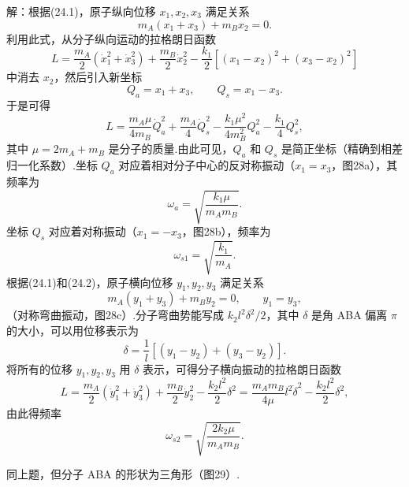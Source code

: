 \begin{xiti}
解：根据(24.1)，原子纵向位移 $x_1,x_2,x_3$ 满足关系
\begin{equation*}
  m_A\left(x_1+x_3\right)+m_Bx_2=0.
\end{equation*}
利用此式，从分子纵向运动的拉格朗日函数
\begin{equation*}
  L=\frac{m_A}{2}\left(\dot{x}_1^2+\dot{x}_3^2\right)+\frac{m_B}{2}\dot{x}_2^2
  -\frac{k_1}{2}\left[\left(x_1-x_2\right)^2+\left(x_3-x_2\right)^2\right]
\end{equation*}
中消去 $x_2$，然后引入新坐标
\begin{equation*}
  Q_a=x_1+x_3,\qquad
  Q_s=x_1-x_3.
\end{equation*}
于是可得
\begin{equation*}
  L=\frac{m_A\mu}{4m_B}\dot{Q}_a^2+\frac{m_A}{4}\dot{Q}_s^2
  -\frac{k_1\mu^2}{4m_B^2}Q_a^2-\frac{k_1}{4}Q_s^2,
\end{equation*}
其中 $\mu=2m_A+m_B$ 是分子的质量.由此可见，$Q_a$ 和 $Q_s$ 是简正坐标（精确到相差归一化系数）.坐标 $Q_a$ 对应着相对分子中心的反对称振动（$x_1=x_3$，图28a），其频率为
\begin{equation*}
  \omega_a=\sqrt{\frac{k_1\mu}{m_Am_B}}.
\end{equation*}
坐标 $Q_s$ 对应着对称振动（$x_1=-x_3$，图28b），频率为
\begin{equation*}
  \omega_{s1}=\sqrt{\frac{k_1}{m_A}}.
\end{equation*}
根据(24.1)和(24.2)，原子横向位移 $y_1,y_2,y_3$ 满足关系
\begin{equation*}
  m_A\left(y_1+y_3\right)+m_By_2=0,\qquad y_1=y_3,
\end{equation*}
（对称弯曲振动，图28c）.分子弯曲势能写成 $k_2l^2\delta^2/2$，其中 $\delta$ 是角 ABA 偏离 $\pi$ 的大小，可以用位移表示为
\begin{equation*}
  \delta=\frac{1}{l}\left[\left(y_1-y_2\right)+\left(y_3-y_2\right)\right].
\end{equation*}
将所有的位移 $y_1,y_2,y_3$ 用 $\delta$ 表示，可得分子横向振动的拉格朗日函数
\begin{equation*}
  L=\frac{m_A}{2}\left(\dot{y}_1^2+\dot{y}_3^2\right)+\frac{m_B}{2}\dot{y}_2^2
  -\frac{k_2l^2}{2}\delta^2
  =\frac{m_Am_B}{4\mu}l^2\dot{\delta}^2-\frac{k_2l^2}{2}\delta^2,
\end{equation*}
由此得频率
\begin{equation*}
  \omega_{s2}=\sqrt{\frac{2k_2\mu}{m_Am_B}}.
\end{equation*}

\quad 同上题，但分子 ABA 的形状为三角形（图29）.


\end{xiti}
